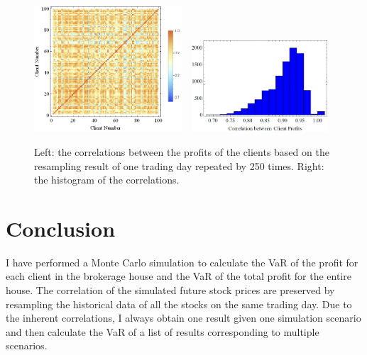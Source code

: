 \documentclass[letterpaper,11pt]{article}
\begin{document}
\begin{figure}[h]
\centering
\includegraphics[width=0.49\textwidth]{corr_clients.png}\ \ 
\includegraphics[width=0.45\textwidth]{hist_corr_clients.png}
\caption{Left: the correlations between the profits of the clients based on the resampling result of one trading day repeated by 250 times.
Right: the histogram of the correlations.}
\label{fig:corr_clients}
\end{figure}

\section{Conclusion}

I have performed a Monte Carlo simulation to calculate the VaR of the profit for each client in the brokerage house and the VaR of the total profit for the entire house.
The correlation of the simulated future stock prices are preserved by resampling the historical data of all the stocks on the same trading day.
Due to the inherent correlations, I always obtain one result given one simulation scenario and then calculate the VaR of a list of results corresponding to multiple scenarios.
\end{document}

